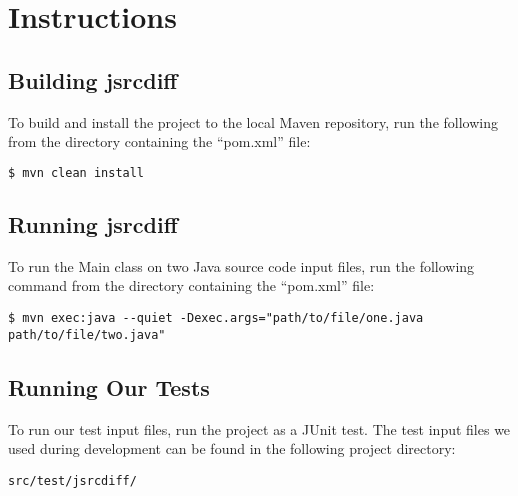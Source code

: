 \chapter{Instructions}

\section{Building jsrcdiff}

To build and install the project to the local Maven repository, run the
following from the directory containing the ``pom.xml'' file:\\

\begin{lstlisting}[language=bash,frame=single,showstringspaces=false]
$ mvn clean install
\end{lstlisting}


\section{Running jsrcdiff}

To run the Main class on two Java source code input files, run the following
command from the directory containing the ``pom.xml'' file:\\

\begin{lstlisting}[frame=single,breaklines=true,showstringspaces=false]
$ mvn exec:java --quiet -Dexec.args="path/to/file/one.java path/to/file/two.java"
\end{lstlisting}

\section{Running Our Tests}

To run our test input files, run the project as a JUnit test. The test input
files we used during development can be found in the following
project directory:\\

\begin{lstlisting}[frame=single,breaklines=true,showstringspaces=false]
src/test/jsrcdiff/
\end{lstlisting}
